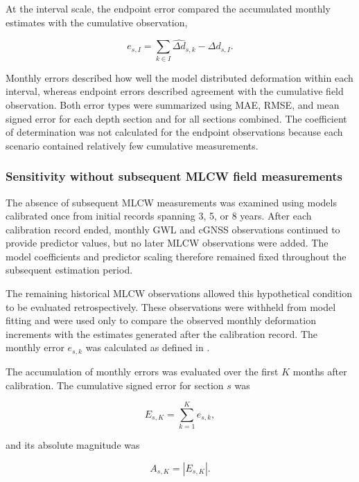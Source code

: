 At the interval scale, the endpoint error compared the accumulated monthly estimates with the cumulative observation,

\begin{equation}
e_{s,I}
=
\sum_{k\in I}\widehat{\Delta d}_{s,k}
-
\Delta d_{s,I}.
\label{eq:sparse_endpoint_error}
\end{equation}

Monthly errors described how well the model distributed deformation within each interval, whereas endpoint errors described agreement with the cumulative field observation. Both error types were summarized using MAE, RMSE, and mean signed error for each depth section and for all sections combined. The coefficient of determination was not calculated for the endpoint observations because each scenario contained relatively few cumulative measurements.

\subsubsection{Sensitivity without subsequent MLCW field measurements}
\label{subsec:permanent_stoppage_sensitivity}

The absence of subsequent MLCW measurements was examined using models calibrated once from initial records spanning 3, 5, or 8 years. After each calibration record ended, monthly GWL and cGNSS observations continued to provide predictor values, but no later MLCW observations were added. The model coefficients and predictor scaling therefore remained fixed throughout the subsequent estimation period.

The remaining historical MLCW observations allowed this hypothetical condition to be evaluated retrospectively. These observations were withheld from model fitting and were used only to compare the observed monthly deformation increments with the estimates generated after the calibration record. The monthly error $e_{s,k}$ was calculated as defined in .

The accumulation of monthly errors was evaluated over the first $K$ months after calibration. The cumulative signed error for section $s$ was

\begin{equation}
E_{s,K}
=
\sum_{k=1}^{K} e_{s,k},
\label{eq:stoppage_cumulative_signed_error}
\end{equation}

and its absolute magnitude was

\begin{equation}
A_{s,K}
=
\left|E_{s,K}\right|.
\label{eq:stoppage_absolute_cumulative_error}
\end{equation}

